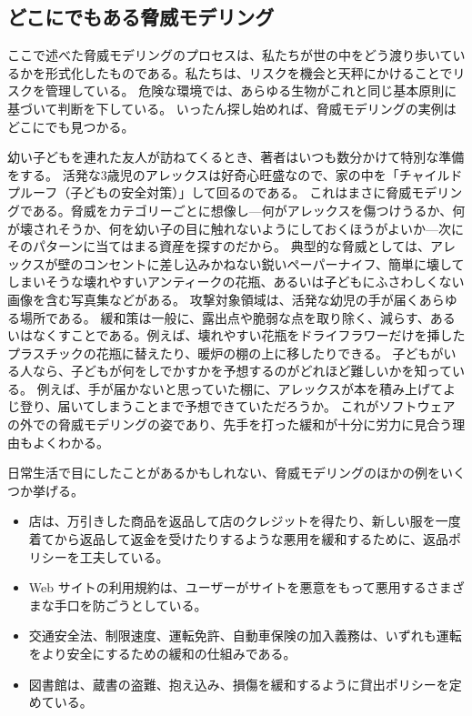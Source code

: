 \documentclass[uplatex]{jsarticle}
\def\label#1{}%
\begin{document}
\subsection{どこにでもある脅威モデリング}\label{subsec:ch2-threat-modeling-everywhere}

ここで述べた脅威モデリングのプロセスは、私たちが世の中をどう渡り歩いているかを形式化したものである。私たちは、リスクを機会と天秤にかけることでリスクを管理している。
危険な環境では、あらゆる生物がこれと同じ基本原則に基づいて判断を下している。
いったん探し始めれば、脅威モデリングの実例はどこにでも見つかる。

\begin{exa}[子どもの安全対策]\label{exa:ch2-child-proofing}
幼い子どもを連れた友人が訪ねてくるとき、著者はいつも数分かけて特別な準備をする。
活発な3歳児のアレックスは好奇心旺盛なので、家の中を「チャイルドプルーフ（子どもの安全対策）」して回るのである。
これはまさに脅威モデリングである。脅威をカテゴリーごとに想像し---何がアレックスを傷つけうるか、何が壊されそうか、何を幼い子の目に触れないようにしておくほうがよいか---次にそのパターンに当てはまる資産を探すのだから。
典型的な脅威としては、アレックスが壁のコンセントに差し込みかねない鋭いペーパーナイフ、簡単に壊してしまいそうな壊れやすいアンティークの花瓶、あるいは子どもにふさわしくない画像を含む写真集などがある。
攻撃対象領域は、活発な幼児の手が届くあらゆる場所である。
緩和策は一般に、露出点や脆弱な点を取り除く、減らす、あるいはなくすことである。例えば、壊れやすい花瓶をドライフラワーだけを挿したプラスチックの花瓶に替えたり、暖炉の棚の上に移したりできる。
子どもがいる人なら、子どもが何をしでかすかを予想するのがどれほど難しいかを知っている。
例えば、手が届かないと思っていた棚に、アレックスが本を積み上げてよじ登り、届いてしまうことまで予想できていただろうか。
これがソフトウェアの外での脅威モデリングの姿であり、先手を打った緩和が十分に労力に見合う理由もよくわかる。
\end{exa}

\begin{exa}[日常生活で見かける脅威モデリング]\label{exa:ch2-everyday-threat-modeling}
日常生活で目にしたことがあるかもしれない、脅威モデリングのほかの例をいくつか挙げる。
\begin{itemize}
\item 店は、万引きした商品を返品して店のクレジットを得たり、新しい服を一度着てから返品して返金を受けたりするような悪用を緩和するために、返品ポリシーを工夫している。
\item Web サイトの利用規約は、ユーザーがサイトを悪意をもって悪用するさまざまな手口を防ごうとしている。
\item 交通安全法、制限速度、運転免許、自動車保険の加入義務は、いずれも運転をより安全にするための緩和の仕組みである。
\item 図書館は、蔵書の盗難、抱え込み、損傷を緩和するように貸出ポリシーを定めている。
\end{itemize}
\end{exa}
\end{document}
